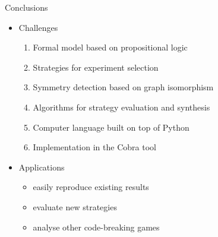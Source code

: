 \documentclass{beamer}
\begin{document}
\begin{frame}{Conclusions}
\begin{itemize}
\item Challenges
\begin{enumerate}[\checkmark]
\item Formal model based on propositional logic
\item Strategies for experiment selection
\item Symmetry detection based on graph isomorphism
\item Algorithms for strategy evaluation and synthesis
\item Computer language built on top of Python
\item Implementation in the Cobra tool
\end{enumerate}\bigskip\pause
\item Applications
\begin{itemize}
\item easily reproduce existing results
\item evaluate new strategies
\item analyse other code-breaking games
\end{itemize}
\end{itemize}
\end{frame}

\end{document}
